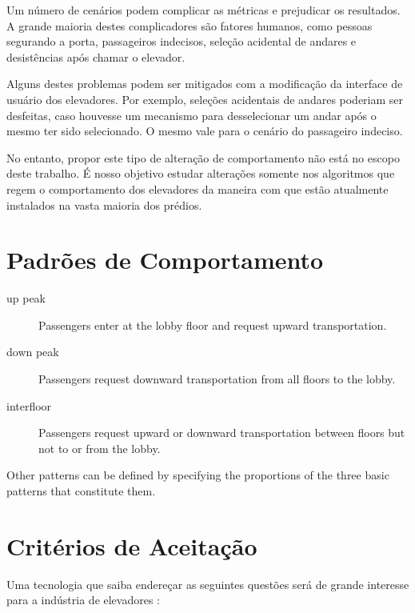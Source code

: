 Um número de cenários podem complicar as métricas e prejudicar os resultados. A
grande maioria destes complicadores são fatores humanos, como pessoas segurando
a porta, passageiros indecisos, seleção acidental de andares e desistências após
chamar o elevador.

Alguns destes problemas podem ser mitigados com a modificação da interface de
usuário dos elevadores. Por exemplo, seleções acidentais de andares poderiam ser
desfeitas, caso houvesse um mecanismo para desselecionar um andar após o mesmo
ter sido selecionado. O mesmo vale para o cenário do passageiro indeciso.

No entanto, propor este tipo de alteração de comportamento não está no escopo
deste trabalho. É nosso objetivo estudar alterações somente nos algoritmos que
regem o comportamento dos elevadores da maneira com que estão atualmente
instalados na vasta maioria dos prédios.

\section{Padrões de Comportamento}

\begin{description}
\item[up peak] Passengers enter at the lobby floor and request upward transportation.
\item[down peak] Passengers request downward transportation from all floors to the lobby.
\item[interfloor] Passengers request upward or downward transportation between floors but not to or from the lobby.
\end{description}

Other patterns can be defined by specifying the proportions of the three basic patterns that constitute them.

\section{Critérios de Aceitação}

Uma tecnologia que saiba endereçar as seguintes questões será de grande interesse para a indústria de elevadores \cite{KOEHLEROTTIGER02}:

